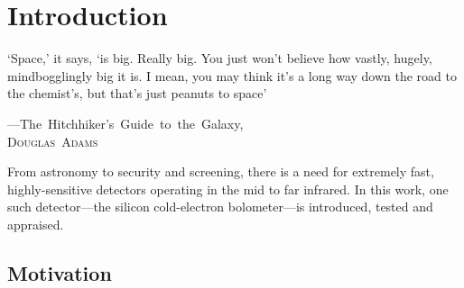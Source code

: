 \chapter{Introduction}
\label{cha:introduction}
%
\epigraph{`Space,' it says, `is big. Really big. You just won't believe how vastly, hugely, mindbogglingly big it is. I mean, you may think it's a long way down the road to the chemist's, but that's just peanuts to space'}{\mbox{\textup{---The Hitchhiker's Guide to the Galaxy,}}\\ \mbox{\textup{\textsc{Douglas Adams}}}}

From astronomy to security and screening, there is a need for extremely fast, highly-sensitive detectors operating in the mid to far infrared. In this work, one such detector---the silicon cold-electron bolometer---is introduced, tested and appraised.

\section{Motivation}\label{sec:motivation}
